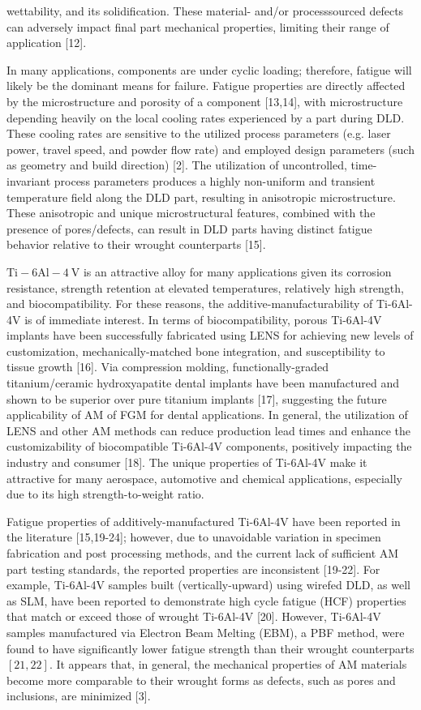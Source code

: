 \documentclass[10pt]{article}
\begin{document}
wettability, and its solidification. These material- and/or processsourced defects can adversely impact final part mechanical properties, limiting their range of application [12].

In many applications, components are under cyclic loading; therefore, fatigue will likely be the dominant means for failure. Fatigue properties are directly affected by the microstructure and porosity of a component [13,14], with microstructure depending heavily on the local cooling rates experienced by a part during DLD. These cooling rates are sensitive to the utilized process parameters (e.g. laser power, travel speed, and powder flow rate) and employed design parameters (such as geometry and build direction) [2]. The utilization of uncontrolled, time-invariant process parameters produces a highly non-uniform and transient temperature field along the DLD part, resulting in anisotropic microstructure. These anisotropic and unique microstructural features, combined with the presence of pores/defects, can result in DLD parts having distinct fatigue behavior relative to their wrought counterparts [15].

$\mathrm{Ti}-6 \mathrm{Al}-4 \mathrm{~V}$ is an attractive alloy for many applications given its corrosion resistance, strength retention at elevated temperatures, relatively high strength, and biocompatibility. For these reasons, the additive-manufacturability of Ti-6Al-4V is of immediate interest. In terms of biocompatibility, porous Ti-6Al-4V implants have been successfully fabricated using LENS for achieving new levels of customization, mechanically-matched bone integration, and susceptibility to tissue growth [16]. Via compression molding, functionally-graded titanium/ceramic hydroxyapatite dental implants have been manufactured and shown to be superior over pure titanium implants [17], suggesting the future applicability of AM of FGM for dental applications. In general, the utilization of LENS and other AM methods can reduce production lead times and enhance the customizability of biocompatible Ti-6Al-4V components, positively impacting the industry and consumer [18]. The unique properties of Ti-6Al-4V make it attractive for many aerospace, automotive and chemical applications, especially due to its high strength-to-weight ratio.

Fatigue properties of additively-manufactured Ti-6Al-4V have been reported in the literature [15,19-24]; however, due to unavoidable variation in specimen fabrication and post processing methods, and the current lack of sufficient AM part testing standards, the reported properties are inconsistent [19-22]. For example, Ti-6Al-4V samples built (vertically-upward) using wirefed DLD, as well as SLM, have been reported to demonstrate high cycle fatigue (HCF) properties that match or exceed those of wrought Ti-6Al-4V [20]. However, Ti-6Al-4V samples manufactured via Electron Beam Melting (EBM), a PBF method, were found to have significantly lower fatigue strength than their wrought counterparts $[21,22]$. It appears that, in general, the mechanical properties of AM materials become more comparable to their wrought forms as defects, such as pores and inclusions, are minimized [3].
\end{document}
